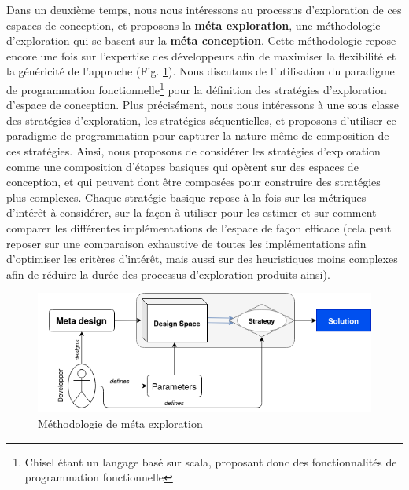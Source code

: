     Dans un deuxième temps, nous nous intéressons au processus d'exploration de ces espaces de conception, et proposons la {\bf méta exploration}, une méthodologie d'exploration qui se basent sur la {\bf méta conception}.
    Cette méthodologie repose encore une fois sur l'expertise des développeurs afin de maximiser la flexibilité et la généricité de l'approche (Fig. \ref{ch.resume:sec.exploration:fig.metaexploration}).
    Nous discutons de l'utilisation du paradigme de programmation fonctionnelle\footnote{Chisel étant un langage basé sur scala, proposant donc des fonctionnalités de programmation fonctionnelle} pour la définition des stratégies d'exploration d'espace de conception.
    Plus précisément, nous nous intéressons à une sous classe des stratégies d'exploration, les stratégies séquentielles, et proposons d'utiliser ce paradigme de programmation pour capturer la nature même de composition de ces stratégies.
    Ainsi, nous proposons de considérer les stratégies d'exploration comme une composition d'étapes basiques qui opèrent sur des espaces de conception, et qui peuvent dont être composées pour construire des stratégies plus complexes.
    Chaque stratégie basique repose à la fois sur les métriques d'intérêt à considérer, sur la façon à utiliser pour les estimer et sur comment comparer les différentes implémentations de l'espace de façon efficace (cela peut reposer sur une comparaison exhaustive de toutes les implémentations afin d'optimiser les critères d'intérêt, mais aussi sur des heuristiques moins complexes afin de réduire la durée des processus d'exploration produits ainsi).

    \begin{figure}[h!]
        \centering
        \includegraphics[width=1.0\textwidth]{Figures/Methodology-metaexploration}
        \caption{Méthodologie de méta exploration}
        \label{ch.resume:sec.exploration:fig.metaexploration}
    \end{figure}

